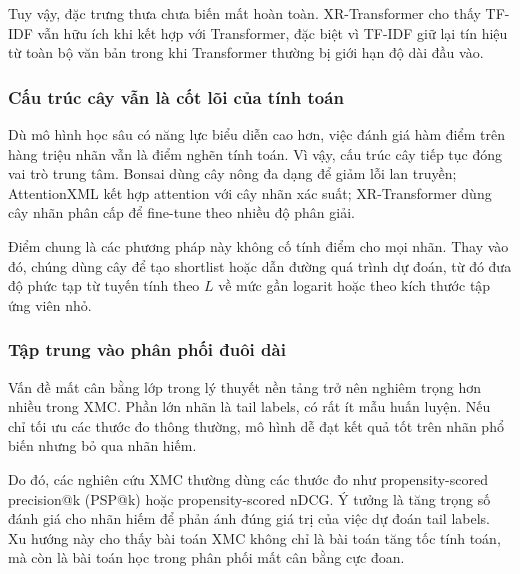 Tuy vậy, đặc trưng thưa chưa biến mất hoàn toàn. XR-Transformer cho thấy TF-IDF vẫn hữu ích khi kết hợp với Transformer, đặc biệt vì TF-IDF giữ lại tín hiệu từ toàn bộ văn bản trong khi Transformer thường bị giới hạn độ dài đầu vào.

\subsubsection{Cấu trúc cây vẫn là cốt lõi của tính toán}

Dù mô hình học sâu có năng lực biểu diễn cao hơn, việc đánh giá hàm điểm trên hàng triệu nhãn vẫn là điểm nghẽn tính toán. Vì vậy, cấu trúc cây tiếp tục đóng vai trò trung tâm. Bonsai dùng cây nông đa dạng để giảm lỗi lan truyền; AttentionXML kết hợp attention với cây nhãn xác suất; XR-Transformer dùng cây nhãn phân cấp để fine-tune theo nhiều độ phân giải.

Điểm chung là các phương pháp này không cố tính điểm cho mọi nhãn. Thay vào đó, chúng dùng cây để tạo shortlist hoặc dẫn đường quá trình dự đoán, từ đó đưa độ phức tạp từ tuyến tính theo $L$ về mức gần logarit hoặc theo kích thước tập ứng viên nhỏ.

\subsubsection{Tập trung vào phân phối đuôi dài}

Vấn đề mất cân bằng lớp trong lý thuyết nền tảng trở nên nghiêm trọng hơn nhiều trong XMC. Phần lớn nhãn là tail labels, có rất ít mẫu huấn luyện. Nếu chỉ tối ưu các thước đo thông thường, mô hình dễ đạt kết quả tốt trên nhãn phổ biến nhưng bỏ qua nhãn hiếm.

Do đó, các nghiên cứu XMC thường dùng các thước đo như propensity-scored precision@k (PSP@k) hoặc propensity-scored nDCG. Ý tưởng là tăng trọng số đánh giá cho nhãn hiếm để phản ánh đúng giá trị của việc dự đoán tail labels. Xu hướng này cho thấy bài toán XMC không chỉ là bài toán tăng tốc tính toán, mà còn là bài toán học trong phân phối mất cân bằng cực đoan.

